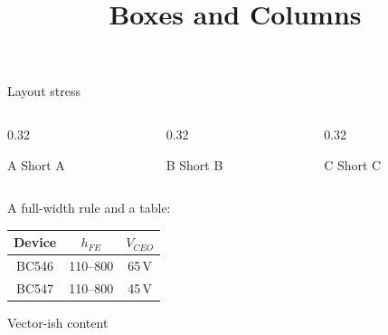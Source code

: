 \documentclass[aspectratio=169]{beamer}
\title{Boxes and Columns}
\begin{document}
\begin{frame}
  \titlepage
\end{frame}

\begin{frame}{Layout stress}
  \begin{columns}[c]
    \begin{column}{0.32\textwidth}
      \begin{block}{A}
        Short A
      \end{block}
    \end{column}
    \begin{column}{0.32\textwidth}
      \begin{alertblock}{B}
        Short B
      \end{alertblock}
    \end{column}
    \begin{column}{0.32\textwidth}
      \begin{exampleblock}{C}
        Short C
      \end{exampleblock}
    \end{column}
  \end{columns}

  \vspace{1em}
  A full-width rule and a table:
  \begin{center}
    \begin{tabular}{|c|c|c|}
      \hline
      Device & $h_{FE}$ & $V_{CEO}$ \\
      \hline
      BC546 & 110--800 & 65\,V \\
      BC547 & 110--800 & 45\,V \\
      \hline
    \end{tabular}
  \end{center}
\end{frame}

\begin{frame}{Vector-ish content}
\end{frame}
\end{document}
